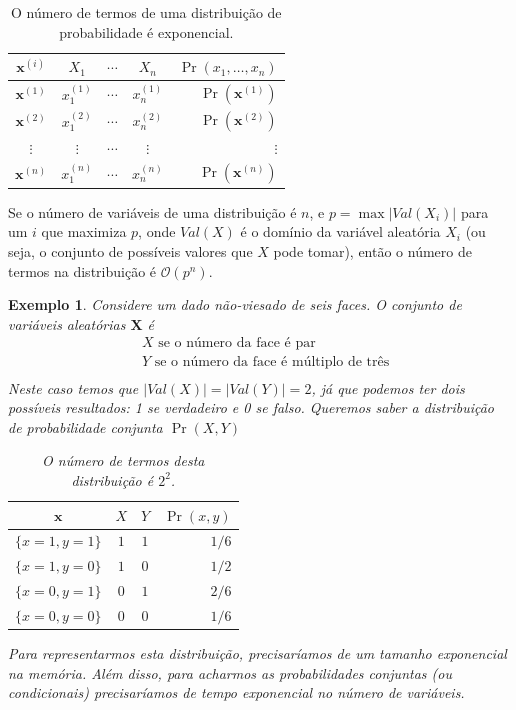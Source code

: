 \documentclass{amsart}
\theoremstyle{plain}
\newcounter{dummy-def}\numberwithin{dummy-def}{subsection}
\newcounter{dummy-thm}\numberwithin{dummy-thm}{subsection}
\newcounter{dummy-prop}\numberwithin{dummy-prop}{subsection}
\newcounter{dummy-ex}\numberwithin{dummy-ex}{subsection}
\newcounter{dummy-eg}\numberwithin{dummy-eg}{subsection}
\newtheorem{example}[dummy-eg]{Exemplo}
\numberwithin{equation}{subsection}
\newcommand{\set}[1]{\mathbf{#1}}
\newcommand{\bigo}{\mathcal{O}}
\begin{document}
\begin{table}[h]
  \begin{center}
    \begin{tabular}{c | c c c | r}
      $\set{x}^{(i)}$ & $X_1$ & $\cdots$ & $X_n$ & $\Pr(x_1,\ldots,x_n)$ \\
      \hline
      $\set{x}^{(1)}$ & $x_1^{(1)}$ & $\cdots$ & $x_n^{(1)}$ & $\Pr(\set{x}^{(1)})$ \\
      $\set{x}^{(2)}$ & $x_1^{(2)}$ & $\cdots$ & $x_n^{(2)}$ & $\Pr(\set{x}^{(2)})$ \\
      $\vdots$ & $\vdots$ & $\cdots$ & $\vdots$ & $\vdots$ \\
      $\set{x}^{(n)}$ & $x_1^{(n)}$ & $\cdots$ & $x_n^{(n)}$ & $\Pr(\set{x}^{(n)})$ \\
    \end{tabular}
    \caption{O número de termos de uma distribuição de probabilidade é exponencial.}
  \end{center}
\end{table}

Se o número de variáveis de uma distribuição é $n$, e $p = \max |Val(X_i)|$ para um $i$ que
maximiza $p$, onde $Val(X)$ é o domínio da variável aleatória $X_i$ (ou seja, o conjunto de
possíveis valores que $X$ pode tomar), então o número de termos na distribuição é $\bigo(p^n)$.

\begin{example}
  Considere um dado não-viesado de seis faces. O conjunto de variáveis aleatórias $\set{X}$ é
  \begin{align*}
    & X\text{~se o número da face é par} \\
    & Y\text{~se o número da face é múltiplo de três} \\
  \end{align*}
  Neste caso temos que $|Val(X)|=|Val(Y)|=2$, já que podemos ter dois possíveis resultados: 1 se
  verdadeiro e 0 se falso. Queremos saber a distribuição de probabilidade conjunta $\Pr(X, Y)$
  \begin{table}[h]
    \begin{center}
      \begin{tabular}{c | c c | r}
        $\set{x}$ & $X$ & $Y$ & $\Pr(x, y)$ \\
        \hline
        $\{x=1,y=1\}$ & $1$ & $1$ & $1/6$ \\
        $\{x=1,y=0\}$ & $1$ & $0$ & $1/2$ \\
        $\{x=0,y=1\}$ & $0$ & $1$ & $2/6$ \\
        $\{x=0,y=0\}$ & $0$ & $0$ & $1/6$ \\
      \end{tabular}
      \caption{O número de termos desta distribuição é $2^2$.}
    \end{center}
  \end{table}
  Para representarmos esta distribuição, precisaríamos de um tamanho exponencial na memória. Além
  disso, para acharmos as probabilidades conjuntas (ou condicionais) precisaríamos de tempo
  exponencial no número de variáveis.
\end{example}
\end{document}
